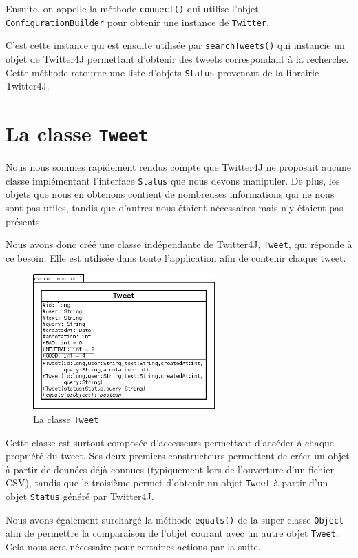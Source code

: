 \documentclass[12pt,a4paper]{report}
\begin{document}
Ensuite, on appelle la méthode \texttt{connect()} qui utilise l'objet
\texttt{ConfigurationBuilder} pour obtenir une instance de \texttt{Twitter}.

C'est cette instance qui est ensuite utilisée par \texttt{searchTweets()} qui
instancie un objet de Twitter4J permettant d'obtenir des tweets correspondant
à la recherche. Cette méthode retourne une liste d'objets \texttt{Status}
provenant de la librairie Twitter4J.

\section{La classe \texttt{Tweet}}

Nous nous sommes rapidement rendus compte que Twitter4J ne proposait aucune
classe implémentant l'interface \texttt{Status} que nous devons manipuler. De
plus, les objets que nous en obtenons contient de nombreuses informations qui ne
nous sont pas utiles, tandis que d'autres nous étaient nécessaires mais
n'y étaient pas présents.

Nous avons donc créé une classe indépendante de Twitter4J, \texttt{Tweet}, qui
réponde à ce besoin. Elle est utilisée dans toute l'application afin de contenir
chaque tweet.

\begin{figure}[h]
    \centering
    \includegraphics[width=7cm]{img/uml_tweet.png}
    \caption{La classe \texttt{Tweet}}
    \label{uml_tweet}
\end{figure}

Cette classe est surtout composée d'accesseurs permettant d'accéder à chaque
propriété du tweet. Ses deux premiers constructeurs permettent de créer un objet
à partir de données déjà connues (typiquement lors de l'ouverture d'un fichier
CSV), tandis que le troisième permet d'obtenir un objet \texttt{Tweet} à partir
d'un objet \texttt{Status} généré par Twitter4J.

Nous avons également surchargé la méthode \texttt{equals()} de la super-classe
\texttt{Object} afin de permettre la comparaison de l'objet courant avec un
autre objet \texttt{Tweet}. Cela nous sera nécessaire pour certaines actions par
la suite.
\end{document}

